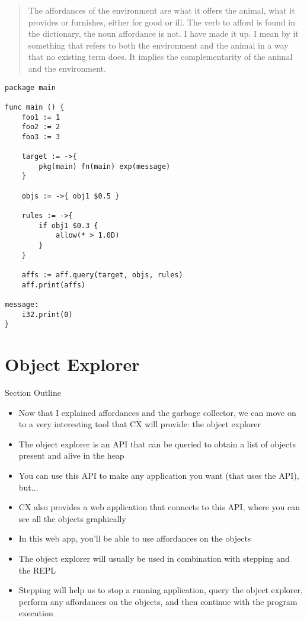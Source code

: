 \documentclass[11pt,fleqn,openany]{book} %
\begin{document}
\begin{quote}
The affordances of the environment are what it offers the animal, what it provides or furnishes, either for good or ill. The verb to afford is found in the dictionary, the noun affordance is not. I have made it up. I mean by it something that refers to both the environment and the animal in a way that no existing term does. It implies the complementarity of the animal and the environment.
\end{quote}



\begin{lstlisting}[caption={Using Affordances on an Expression},captionpos=b,label={listing:affordances-example1}]
package main

func main () {
  	foo1 := 1
  	foo2 := 2
  	foo3 := 3
	
	target := ->{
  		pkg(main) fn(main) exp(message)
  	}
  	
  	objs := ->{ obj1 $0.5 }
	
  	rules := ->{
  		if obj1 $0.3 {
  			allow(* > 1.0D)
  		}
  	}
	
  	affs := aff.query(target, objs, rules)
  	aff.print(affs)
	
message:
  	i32.print(0)
}
\end{lstlisting}


\chapter{Object Explorer}
\label{chapter:object-explorer}

\begin{remark}
Section Outline
    \begin{itemize}
    	\item Now that I explained affordances and the garbage collector, we can move on to a very interesting tool that CX will provide: the object explorer
        \item The object explorer is an API that can be queried to obtain a list of objects present and alive in the heap
        \item You can use this API to make any application you want (that uses the API), but...
        \item CX also provides a web application that connects to this API, where you can see all the objects graphically
        \item In this web app, you'll be able to use affordances on the objects
        \item The object explorer will usually be used in combination with stepping and the REPL
        \item Stepping will help us to stop a running application, query the object explorer, perform any affordances on the objects, and then continue with the program execution
    \end{itemize}
\end{remark}
\end{document}
